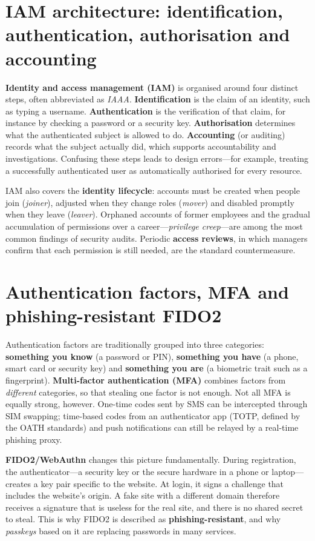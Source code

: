 \section{IAM architecture: identification, authentication, authorisation and accounting}\label{sec:8.1}
\textbf{Identity and access management (IAM)} is organised around four distinct steps, often abbreviated as \emph{IAAA}. \textbf{Identification} is the claim of an identity, such as typing a username. \textbf{Authentication} is the verification of that claim, for instance by checking a password or a security key. \textbf{Authorisation} determines what the authenticated subject is allowed to do. \textbf{Accounting} (or auditing) records what the subject actually did, which supports accountability and investigations. Confusing these steps leads to design errors—for example, treating a successfully authenticated user as automatically authorised for every resource.

IAM also covers the \textbf{identity lifecycle}: accounts must be created when people join (\emph{joiner}), adjusted when they change roles (\emph{mover}) and disabled promptly when they leave (\emph{leaver}). Orphaned accounts of former employees and the gradual accumulation of permissions over a career—\emph{privilege creep}—are among the most common findings of security audits. Periodic \textbf{access reviews}, in which managers confirm that each permission is still needed, are the standard countermeasure.

\section{Authentication factors, MFA and phishing-resistant FIDO2}\label{sec:8.2}
Authentication factors are traditionally grouped into three categories: \textbf{something you know} (a password or PIN), \textbf{something you have} (a phone, smart card or security key) and \textbf{something you are} (a biometric trait such as a fingerprint). \textbf{Multi-factor authentication (MFA)} combines factors from \emph{different} categories, so that stealing one factor is not enough. Not all MFA is equally strong, however. One-time codes sent by SMS can be intercepted through SIM swapping; time-based codes from an authenticator app (TOTP, defined by the OATH standards) and push notifications can still be relayed by a real-time phishing proxy.

\textbf{FIDO2/WebAuthn} changes this picture fundamentally. During registration, the authenticator—a security key or the secure hardware in a phone or laptop—creates a key pair specific to the website. At login, it signs a challenge that includes the website's origin. A fake site with a different domain therefore receives a signature that is useless for the real site, and there is no shared secret to steal. This is why FIDO2 is described as \textbf{phishing-resistant}, and why \emph{passkeys} based on it are replacing passwords in many services.

